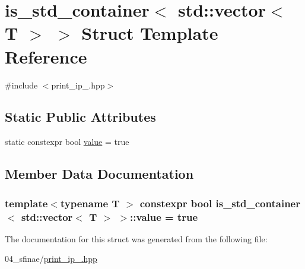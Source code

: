 \hypertarget{structis__std__container_3_01std_1_1vector_3_01T_01_4_01_4}{}\section{is\+\_\+std\+\_\+container$<$ std\+:\+:vector$<$ T $>$ $>$ Struct Template Reference}
\label{structis__std__container_3_01std_1_1vector_3_01T_01_4_01_4}


{\ttfamily \#include $<$print\+\_\+ip\+\_.\+hpp$>$}

\subsection*{Static Public Attributes}
\begin{DoxyCompactItemize}
\item 
static constexpr bool \hyperlink{structis__std__container_3_01std_1_1vector_3_01T_01_4_01_4_a97ed02fdb44495baa0ec78414c2e0e16}{value} = true
\end{DoxyCompactItemize}


\subsection{Member Data Documentation}
\subsubsection[{\texorpdfstring{value}{value}}]{\setlength{\rightskip}{0pt plus 5cm}template$<$typename T $>$ constexpr bool {\bf is\+\_\+std\+\_\+container}$<$ std\+::vector$<$ T $>$ $>$\+::value = true\hspace{0.3cm}{\ttfamily [static]}}\hypertarget{structis__std__container_3_01std_1_1vector_3_01T_01_4_01_4_a97ed02fdb44495baa0ec78414c2e0e16}{}\label{structis__std__container_3_01std_1_1vector_3_01T_01_4_01_4_a97ed02fdb44495baa0ec78414c2e0e16}


The documentation for this struct was generated from the following file\+:\begin{DoxyCompactItemize}
\item 
04\+\_\+sfinae/\hyperlink{print__ip__04_8hpp}{print\+\_\+ip\+\_.\+hpp}\end{DoxyCompactItemize}
